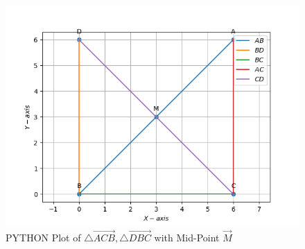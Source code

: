 \begin{enumerate}[label=\thesection.\arabic*,ref=\thesection.\theenumi]
\begin{enumerate}
\begin{figure}[H]
        \includegraphics[width = \columnwidth]{figs/python_plot.png}
    \caption{PYTHON Plot of $\triangle \vec{ACB} ,\triangle \vec{DBC}$ with Mid-Point $\vec{M}$}
    \label{fig:fig-2}
\end{figure}
\end{enumerate}
\end{enumerate}

